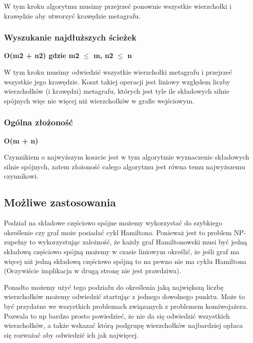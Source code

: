 \documentclass[a4paper,10pt]{article}
\begin{document}
W tym kroku algorytmu musimy przejrzeć ponownie wszystkie wierzchołki i
krawędzie aby utworzyć krawędzie metagrafu.

\subsubsection{Wyszukanie najdłuższych ścieżek}
\begin{center}
{\large\bf O(m2 + n2) gdzie m2 $\leq$ m, n2 $\leq$ n}
\end{center}

W tym kroku musimy odwiedzić wszystkie wierzchołki metagrafu i przejrzeć
wszystkie jego krawędzie. Koszt takiej operacji jest liniowy względem
liczby wierzchołków (i krawędzi) metagrafu, których jest tyle ile
składowych silnie spójnych więc nie więcej niż wierzchołków w grafie
wejściowym.

\subsubsection{Ogólna złożoność}
\begin{center}
{\large\bf O(m + n)}
\end{center}

Czynnikiem o najwyższym koszcie jest w tym algorytmie wyznaczenie
składowych silnie spójnych, zatem złożoność całego algorytmu jest
równa temu najwyższemu czynnikowi.

\subsection{Możliwe zastosowania}

Podział na składowe częściowo spójne możemy wykorzystać do szybkiego
określenie czy graf może posiadać cykl Hamiltona. Ponieważ jest to
problem NP-zupełny to wykorzystując zależność, że każdy graf
Hamiltonowski musi być jedną składową częściowo spójną możemy w czasie
liniowym określić, że jeśli graf ma więcej niż jedną składową
częściowo spójną to na pewno nie ma cyklu Hamiltona (Oczywiście
implikacja w drugą stronę nie jest prawdziwa).

Ponadto możemy użyć tego podziału do określenia jaką największą liczbę
wierzchołków możemy odwiedzić startując z jednego dowolnego
punktu. Może to być przydatne we wszystkich problemach związanych z
problemem komiwojażera. Pozwala to np bardzo prosto powiedzieć, że nie
da się odwiedzić wszystkich wierzchołków, a także wskazać którą
podgrupę wierzchołków najbardziej opłaca się rozważać aby odwiedzić
ich jak najwięcej.
\end{document}
